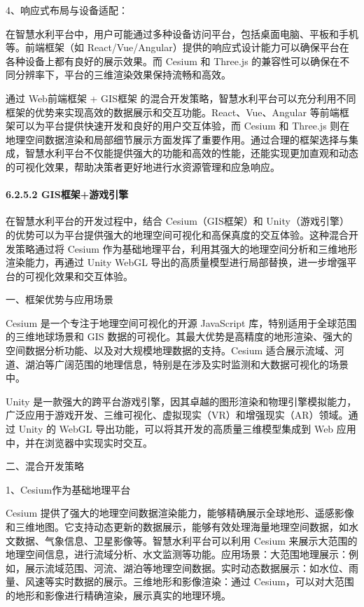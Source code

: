 4、响应式布局与设备适配：

在智慧水利平台中，用户可能通过多种设备访问平台，包括桌面电脑、平板和手机等。前端框架（如 React/Vue/Angular）提供的响应式设计能力可以确保平台在各种设备上都有良好的展示效果。而 Cesium 和 Three.js 的兼容性可以确保在不同分辨率下，平台的三维渲染效果保持流畅和高效。

通过 Web前端框架 + GIS框架 的混合开发策略，智慧水利平台可以充分利用不同框架的优势来实现高效的数据展示和交互功能。React、Vue、Angular 等前端框架可以为平台提供快速开发和良好的用户交互体验，而 Cesium 和 Three.js 则在地理空间数据渲染和局部细节展示方面发挥了重要作用。通过合理的框架选择与集成，智慧水利平台不仅能提供强大的功能和高效的性能，还能实现更加直观和动态的可视化效果，帮助决策者更好地进行水资源管理和应急响应。

\paragraph{6.2.5.2 GIS框架+游戏引擎}\label{gisux6846ux67b6ux6e38ux620fux5f15ux64ce}

在智慧水利平台的开发过程中，结合 Cesium（GIS框架）和 Unity（游戏引擎）的优势可以为平台提供强大的地理空间可视化和高保真度的交互体验。这种混合开发策略通过将 Cesium 作为基础地理平台，利用其强大的地理空间分析和三维地形渲染能力，再通过 Unity WebGL 导出的高质量模型进行局部替换，进一步增强平台的可视化效果和交互体验。

一、框架优势与应用场景

Cesium 是一个专注于地理空间可视化的开源 JavaScript 库，特别适用于全球范围的三维地球场景和 GIS 数据的可视化。其最大优势是高精度的地形渲染、强大的空间数据分析功能、以及对大规模地理数据的支持。Cesium 适合展示流域、河道、湖泊等广阔范围的地理信息，特别是在涉及实时监测和大数据可视化的场景中。

Unity 是一款强大的跨平台游戏引擎，因其卓越的图形渲染和物理引擎模拟能力，广泛应用于游戏开发、三维可视化、虚拟现实（VR）和增强现实（AR）领域。通过 Unity 的 WebGL 导出功能，可以将其开发的高质量三维模型集成到 Web 应用中，并在浏览器中实现实时交互。

二、混合开发策略

1、Cesium作为基础地理平台

Cesium 提供了强大的地理空间数据渲染能力，能够精确展示全球地形、遥感影像和三维地图。它支持动态更新的数据展示，能够有效处理海量地理空间数据，如水文数据、气象信息、卫星影像等。智慧水利平台可以利用 Cesium 来展示大范围的地理空间信息，进行流域分析、水文监测等功能。应用场景：大范围地理展示：例如，展示流域范围、河流、湖泊等地理空间数据。实时动态数据展示：如水位、雨量、风速等实时数据的展示。三维地形和影像渲染：通过 Cesium，可以对大范围的地形和影像进行精确渲染，展示真实的地理环境。

